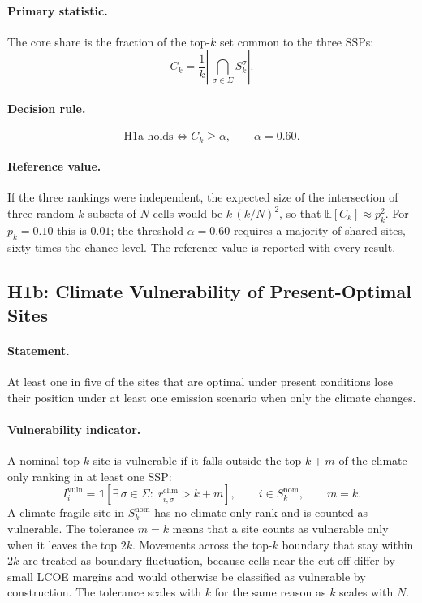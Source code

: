 \paragraph{Primary statistic.}
The core share is the fraction of the top-$k$ set common to the three SSPs:
\begin{equation}
    C_k=\frac{1}{k}\left|\,\bigcap_{\sigma\in\Sigma} S^{\sigma}_{k}\right|.
    \label{eq:h1a_core}
\end{equation}

\paragraph{Decision rule.}
\begin{equation}
    \text{H1a holds}\iff C_k\geq\alpha,\qquad \alpha=0.60.
    \label{eq:h1a_rule}
\end{equation}

\paragraph{Reference value.}
If the three rankings were independent, the expected size of the intersection
of three random $k$-subsets of $N$ cells would be $k\,(k/N)^{2}$, so that
$\mathbb{E}[C_k]\approx p_k^{2}$. For $p_k=0.10$ this is $0.01$; the threshold
$\alpha=0.60$ requires a majority of shared sites, sixty times the chance
level. The reference value is reported with every result.

\subsection{H1b: Climate Vulnerability of Present-Optimal Sites}
\label{subsec:h1b}

\paragraph{Statement.}
At least one in five of the sites that are optimal under present conditions
lose their position under at least one emission scenario when only the climate
changes.

\paragraph{Vulnerability indicator.}
A nominal top-$k$ site is vulnerable if it falls outside the top $k+m$ of the
climate-only ranking in at least one SSP:
\begin{equation}
    I^{\mathrm{vuln}}_{i}
    =\mathbb{1}\!\left[\exists\,\sigma\in\Sigma:\;
    r^{\mathrm{clim}}_{i,\sigma}>k+m\right],
    \qquad i\in S^{\mathrm{nom}}_{k},
    \qquad m=k.
    \label{eq:h1b_indicator}
\end{equation}
A climate-fragile site in $S^{\mathrm{nom}}_{k}$ has no climate-only rank and is
counted as vulnerable.
The tolerance $m=k$ means that a site counts as vulnerable only when it leaves
the top $2k$. Movements across the top-$k$ boundary that stay within $2k$ are
treated as boundary fluctuation, because cells near the cut-off differ by
small LCOE margins and would otherwise be classified as vulnerable by
construction. The tolerance scales with $k$ for the same reason as $k$ scales
with $N$.

